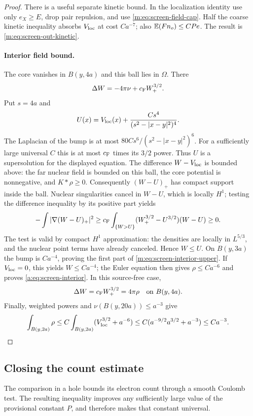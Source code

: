 \begin{proof}
There is a useful separate kinetic bound.  In the localization identity
use only $e_X\ge E$, drop pair repulsion, and use
\eqref{m:eq:screen-field-cap}.  Half the coarse kinetic inequality
absorbs $V_{\rm loc}$ at cost $Ca^{-7}$; also
$\mathbb E(Fn_o)\le CPe$.  The result is
\eqref{m:eq:screen-out-kinetic}.

\paragraph{Interior field bound.}
The core vanishes in $B(y,4a)$ and this ball lies in $\Omega$.
There
\[
 \Delta W=-4\pi\nu+c_{\mathrm F} W_+^{3/2}.
\]
Put $s=4a$ and
\[
 U(x)=V_{\rm loc}(x)+\frac{C s^4}{(s^2-|x-y|^2)^4}.
\]
The Laplacian of the bump is at most
$80Cs^6/(s^2-|x-y|^2)^6$.  For a sufficiently large universal $C$
this is at most $c_{\mathrm F}$ times its $3/2$ power.  Thus $U$ is a
supersolution for the displayed equation.  The difference $W-V_{\rm loc}$
is bounded above: the far nuclear field is bounded on this ball,
the core potential is nonnegative, and $K*\rho\ge0$.
Consequently $(W-U)_+$ has compact support inside the ball.
Nuclear singularities cancel in $W-U$, which is locally $H^1$;
testing the difference inequality by its positive part yields
\[
 -\int|\nabla(W-U)_+|^2
 \ge c_{\mathrm F}\int_{\{W>U\}}(W_+^{3/2}-U^{3/2})(W-U)\ge0.
\]
The test is valid by compact $H^1$ approximation: the densities
are locally in $L^{5/3}$, and the nuclear point terms have already
canceled.  Hence $W\le U$.  On $B(y,3a)$ the bump is $Ca^{-4}$,
proving the first part of \eqref{m:eq:screen-interior-upper}.
If $V_{\rm loc}=0$, this yields $W\le Ca^{-4}$; the Euler equation
then gives $\rho\le Ca^{-6}$ and proves
\eqref{a:eq:screen-interior}.  In this source-free case,
\begin{equation}\label{a:eq:screen-poisson}
 \Delta W=c_{\mathrm F} W_+^{3/2}=4\pi\rho
       \quad\hbox{on }B(y,4a).
\end{equation}
Finally, weighted powers and $\nu(B(y,20a))\le a^{-3}$ give
\[
 \int_{B(y,2a)}\rho
 \le C\int_{B(y,2a)}(V_{\rm loc}^{3/2}+a^{-6})
 \le C(a^{-9/2}a^{3/2}+a^{-3})\le Ca^{-3}.
\]
\end{proof}

\subsection{Closing the count estimate}

The comparison in a hole bounds its electron count through a smooth
Coulomb test.  The resulting inequality improves any sufficiently
large value of the provisional constant $P$, and therefore makes
that constant universal.

